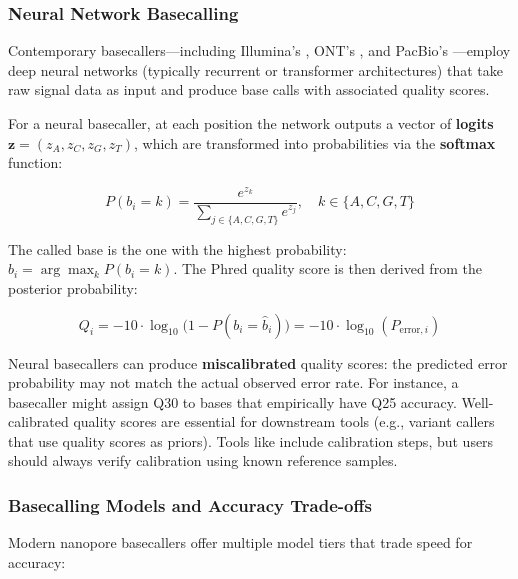 \subsubsection{Neural Network Basecalling}

Contemporary basecallers---including Illumina's , \acrshort{ONT}'s , and PacBio's ---employ deep neural networks (typically recurrent or transformer architectures) that take raw signal data as input and produce base calls with associated quality scores.

For a neural basecaller, at each position the network outputs a vector of \textbf{logits} $\mathbf{z} = (z_A, z_C, z_G, z_T)$, which are transformed into probabilities via the \textbf{softmax} function:

\begin{equation}
P(b_i = k) = \frac{e^{z_k}}{\sum_{j \in \{A,C,G,T\}} e^{z_j}}, \quad k \in \{A,C,G,T\}
\label{eq:seqprinciples:softmax}
\end{equation}

The called base is the one with the highest probability: $\hat{b}_i = \arg\max_k P(b_i = k)$. The Phred quality score is then derived from the posterior probability:

\begin{equation}
Q_i = -10 \cdot \log_{10}\bigl(1 - P(b_i = \hat{b}_i)\bigr) = -10 \cdot \log_{10}(P_{\text{error},i})
\label{eq:seqprinciples:phred-from-softmax}
\end{equation}

\begin{warningbox}[title={Quality Score Calibration}]
Neural basecallers can produce \textbf{miscalibrated} quality scores: the predicted error probability may not match the actual observed error rate. For instance, a basecaller might assign Q30 to bases that empirically have Q25 accuracy. Well-calibrated quality scores are essential for downstream tools (e.g., variant callers that use quality scores as priors). Tools like  include calibration steps, but users should always verify calibration using known reference samples.
\end{warningbox}


\subsubsection{Basecalling Models and Accuracy Trade-offs}

Modern nanopore basecallers offer multiple model tiers that trade speed for accuracy:

